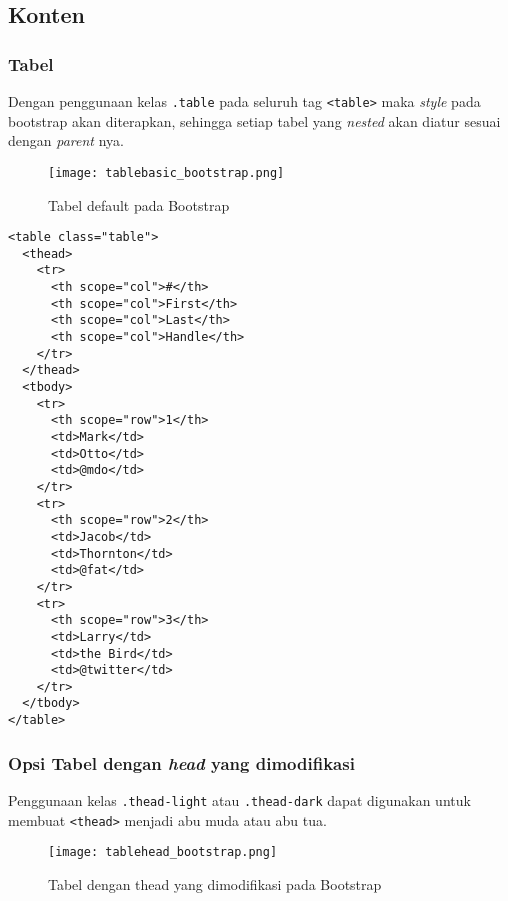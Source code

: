 \subsection{Konten}
\subsubsection{Tabel}
Dengan penggunaan kelas \verb|.table| pada seluruh tag \texttt{<table>} maka \textit{style} pada bootstrap akan diterapkan, sehingga setiap tabel yang \textit{nested} akan diatur sesuai dengan \textit{parent} nya.
\begin{figure} [H]
	\centering  
	\texttt{[image: tablebasic\_bootstrap.png]}  
	\caption{Tabel default pada Bootstrap} 
\end{figure}

\begin{lstlisting}[frame=single] 
<table class="table">
  <thead>
    <tr>
      <th scope="col">#</th>
      <th scope="col">First</th>
      <th scope="col">Last</th>
      <th scope="col">Handle</th>
    </tr>
  </thead>
  <tbody>
    <tr>
      <th scope="row">1</th>
      <td>Mark</td>
      <td>Otto</td>
      <td>@mdo</td>
    </tr>
    <tr>
      <th scope="row">2</th>
      <td>Jacob</td>
      <td>Thornton</td>
      <td>@fat</td>
    </tr>
    <tr>
      <th scope="row">3</th>
      <td>Larry</td>
      <td>the Bird</td>
      <td>@twitter</td>
    </tr>
  </tbody>
</table>
\end{lstlisting}

\subsubsection{Opsi Tabel dengan \textit{head} yang dimodifikasi}
Penggunaan kelas \texttt{.thead-light} atau \texttt{.thead-dark} dapat digunakan untuk membuat \texttt{<thead>} menjadi abu muda atau abu tua.
\begin{figure} [H]
	\centering  
	\texttt{[image: tablehead\_bootstrap.png]}  
	\caption{Tabel dengan thead yang dimodifikasi pada Bootstrap} 
\end{figure}

